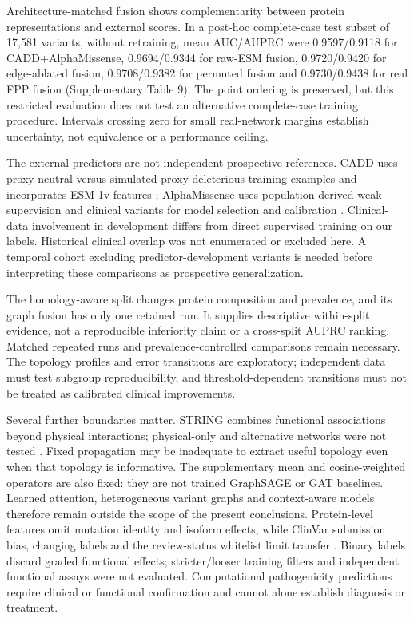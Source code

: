 \documentclass[conference]{IEEEtran}
\newcommand{\CADDAM}{CADD\allowbreak{}+\allowbreak{}AlphaMissense}
\begin{document}
Architecture-matched fusion shows complementarity between protein representations and external scores. In a post-hoc complete-case test subset of 17,581 variants, without retraining, mean AUC/AUPRC were 0.9597/0.9118 for \CADDAM{}, 0.9694/0.9344 for raw-ESM fusion, 0.9720/0.9420 for edge-ablated fusion, 0.9708/0.9382 for permuted fusion and 0.9730/0.9438 for real FPP fusion (Supplementary Table 9). The point ordering is preserved, but this restricted evaluation does not test an alternative complete-case training procedure. Intervals crossing zero for small real-network margins establish uncertainty, not equivalence or a performance ceiling.

The external predictors are not independent prospective references. CADD uses proxy-neutral versus simulated proxy-deleterious training examples and incorporates ESM-1v features \cite{Kircher2014CADD,Schubach2024CADDv17}; AlphaMissense uses population-derived weak supervision and clinical variants for model selection and calibration \cite{Cheng2023AlphaMissense}. Clinical-data involvement in development differs from direct supervised training on our labels. Historical clinical overlap was not enumerated or excluded here. A temporal cohort excluding predictor-development variants is needed before interpreting these comparisons as prospective generalization.

The homology-aware split changes protein composition and prevalence, and its graph fusion has only one retained run. It supplies descriptive within-split evidence, not a reproducible inferiority claim or a cross-split AUPRC ranking. Matched repeated runs and prevalence-controlled comparisons remain necessary. The topology profiles and error transitions are exploratory; independent data must test subgroup reproducibility, and threshold-dependent transitions must not be treated as calibrated clinical improvements.

Several further boundaries matter. STRING combines functional associations beyond physical interactions; physical-only and alternative networks were not tested \cite{Szklarczyk2023STRING}. Fixed propagation may be inadequate to extract useful topology even when that topology is informative. The supplementary mean and cosine-weighted operators are also fixed: they are not trained GraphSAGE or GAT baselines. Learned attention, heterogeneous variant graphs and context-aware models therefore remain outside the scope of the present conclusions. Protein-level features omit mutation identity and isoform effects, while ClinVar submission bias, changing labels and the review-status whitelist limit transfer \cite{Landrum2020ClinVar}. Binary labels discard graded functional effects; stricter/looser training filters and independent functional assays were not evaluated. Computational pathogenicity predictions require clinical or functional confirmation and cannot alone establish diagnosis or treatment.
\end{document}

